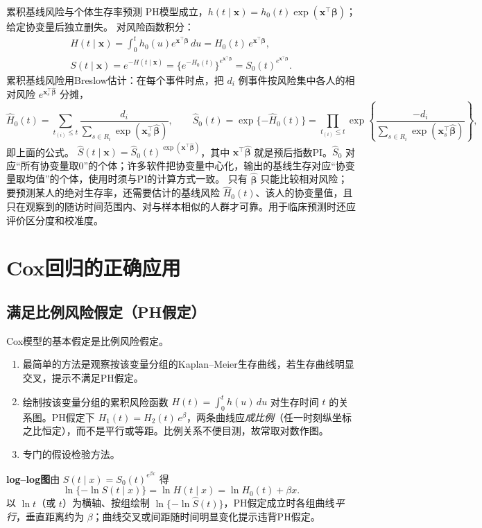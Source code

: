\begin{derivation}{累积基线风险与个体生存率预测}
PH模型成立，$h(t\mid\bm x)=h_0(t)\exp(\bm x^\top\bm\beta)$；给定协变量后独立删失。
对风险函数积分：
\begin{gather*}
H(t\mid\bm x)=\int_0^th_0(u)e^{\bm x^\top\bm\beta}\,du=H_0(t)\,e^{\bm x^\top\bm\beta},\\
S(t\mid\bm x)=e^{-H(t\mid\bm x)}=\{e^{-H_0(t)}\}^{e^{\bm x^\top\bm\beta}}=S_0(t)^{e^{\bm x^\top\bm\beta}} .
\end{gather*}
累积基线风险用Breslow估计：在每个事件时点，把 $d_i$ 例事件按风险集中各人的相对风险 $e^{\bm x_s^\top\widehat{\bm\beta}}$ 分摊，
\[
\widehat H_0(t)=\sum_{t_{(i)}\le t}\frac{d_i}{\sum_{s\in R_i}\exp(\bm x_s^\top\widehat{\bm\beta})},\qquad
\widehat S_0(t)=\exp\{-\widehat H_0(t)\}=\prod_{t_{(i)}\le t}\exp\left\{\frac{-d_i}{\sum_{s\in R_i}\exp(\bm x_s^\top\widehat{\bm\beta})}\right\},
\]
即上面的公式。
$\widehat S(t\mid\bm x)=\widehat S_0(t)^{\exp(\bm x^\top\widehat{\bm\beta})}$，其中 $\bm x^\top\widehat{\bm\beta}$ 就是预后指数PI。$\widehat S_0$ 对应“所有协变量取0”的个体；许多软件把协变量中心化，输出的基线生存对应“协变量取均值”的个体，使用时须与PI的计算方式一致。
只有 $\widehat{\bm\beta}$ 只能比较相对风险；要预测某人的绝对生存率，还需要估计的基线风险 $\widehat H_0(t)$、该人的协变量值，且只在观察到的随访时间范围内、对与样本相似的人群才可靠。用于临床预测时还应评价区分度和校准度。
\end{derivation}
\section{Cox回归的正确应用}
\subsection{满足比例风险假定（PH假定）}
Cox模型的基本假定是比例风险假定。
\begin{enumerate}
\item 最简单的方法是观察按该变量分组的Kaplan--Meier生存曲线，若生存曲线明显交叉，提示不满足PH假定。
\item 绘制按该变量分组的累积风险函数 $H(t)=\int_0^th(u)\,du$ 对生存时间 $t$ 的关系图。PH假定下 $H_1(t)=H_2(t)\,e^{\beta}$，两条曲线应\emph{成比例}（任一时刻纵坐标之比恒定），而不是平行或等距。比例关系不便目测，故常取对数作图。
\item 专门的假设检验方法。
\end{enumerate}
\textbf{log--log图}\quad 由 $S(t\mid x)=S_0(t)^{e^{\beta x}}$ 得
\[
\ln\{-\ln S(t\mid x)\}=\ln H(t\mid x)=\ln H_0(t)+\beta x .
\]
以 $\ln t$（或 $t$）为横轴、按组绘制 $\ln\{-\ln\widehat S(t)\}$，PH假定成立时各组曲线\emph{平行}，垂直距离约为 $\beta$；曲线交叉或间距随时间明显变化提示违背PH假定。

